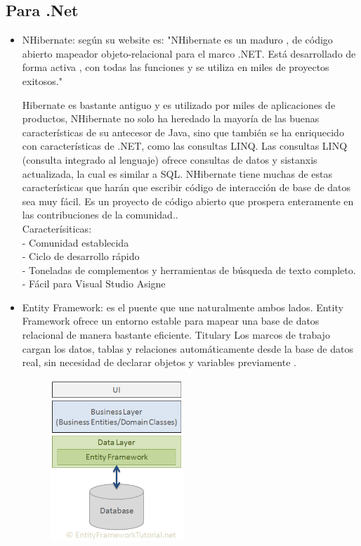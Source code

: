 \documentclass[%
 reprint,
 amsmath,amssymb,
 aps,
]{revtex4-1}
\begin{document}
\subsection{Para .Net}
\begin{itemize}
	\item NHibernate: según su website es: "NHibernate es un maduro , de código abierto mapeador objeto-relacional para el marco .NET. Está desarrollado de forma activa , con todas las funciones y se utiliza en miles de proyectos exitosos."\cite{nhibernate}

Hibernate es bastante antiguo y es utilizado por miles de aplicaciones de productos, NHibernate no solo ha heredado la mayoría de las buenas características de su antecesor de Java, sino que también se ha enriquecido con características de .NET, como las consultas LINQ. Las consultas LINQ (consulta integrado al lenguaje) ofrece consultas de datos y sistanxis actualizada, la cual es similar a SQL.
NHibernate tiene muchas de estas características que harán que escribir código de interacción de base de datos sea muy fácil. Es un proyecto de código abierto que prospera enteramente en las contribuciones de la comunidad..\cite{chatekar2015}\\
Caracterísiticas:\\
- Comunidad establecida\\
- Ciclo de desarrollo rápido\\
- Toneladas de complementos y herramientas de búsqueda de texto completo.\\
- Fácil para Visual Studio Asigne
	\item Entity Framework: es el puente que une naturalmente ambos lados. Entity Framework ofrece un entorno estable para mapear una base de datos relacional de manera bastante eficiente. Titulary Los marcos de trabajo cargan los datos, tablas y relaciones automáticamente desde la base de datos real, sin necesidad de declarar objetos y variables previamente .\cite {ef} \\
\begin{figure}[htb]
\begin{center}
\includegraphics[width=5cm]{./Imagenes/ef}

\end{center}
\end{figure}
\end{itemize}
\end{document}
